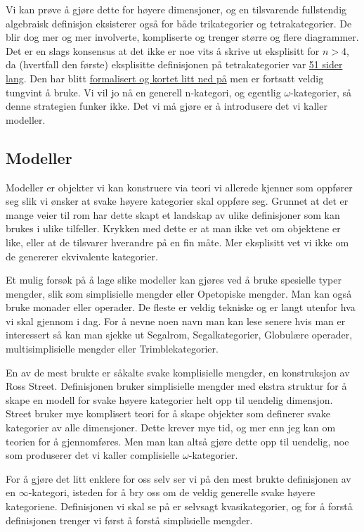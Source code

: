 Vi kan prøve å gjøre dette for høyere dimensjoner, og en tilsvarende fullstendig algebraisk definisjon eksisterer også for både trikategorier og tetrakategorier. 
De blir dog mer og mer involverte, kompliserte og trenger større og flere diagrammer. 
Det er en slags konsensus at det ikke er noe vits å skrive ut eksplisitt for $n>4$, da (hvertfall den første) eksplisitte definisjonen på tetrakategorier var \href{https://math.ucr.edu/home/baez/trimble/tetracategories.html}{51 sider lang}. 
Den har blitt  \href{https://arxiv.org/abs/1112.0560}{formalisert og kortet litt ned på} men er fortsatt veldig tungvint å bruke. 
Vi vil jo nå en generell n-kategori, og egentlig $\omega$-kategorier, så denne strategien funker ikke. 
Det vi må gjøre er å introdusere det vi kaller modeller. 

\subsection{Modeller}
Modeller er objekter vi kan konstruere via teori vi allerede kjenner som oppfører seg slik vi ønsker at svake høyere kategorier skal oppføre seg. 
Grunnet at det er mange veier til rom har dette skapt et landskap av ulike definisjoner som kan brukes i ulike tilfeller. 
Krykken med dette er at man ikke vet om objektene er like, eller at de tilsvarer hverandre på en fin måte. 
Mer eksplisitt vet vi ikke om de genererer ekvivalente kategorier. 

Et mulig forsøk på å lage slike modeller kan gjøres ved å bruke spesielle typer mengder, slik som simplisielle mengder eller Opetopiske mengder. 
Man kan også bruke monader eller operader. 
De fleste er veldig tekniske og er langt utenfor hva vi skal gjennom i dag. 
For å nevne noen navn man kan lese senere hvis man er interessert så kan man sjekke ut Segalrom, Segalkategorier, Globulære operader, multisimplisielle mengder eller Trimblekategorier.

En av de mest brukte er såkalte svake komplisielle mengder, en konstruksjon av Ross Street. 
Definisjonen bruker simplisielle mengder med ekstra struktur for å skape en modell for svake høyere kategorier helt opp til uendelig dimensjon. 
Street bruker mye komplisert teori for å skape objekter som definerer svake kategorier av alle dimensjoner. 
Dette krever mye tid, og mer enn jeg kan om teorien for å gjennomføres. 
Men man kan altså gjøre dette opp til uendelig, noe som produserer det vi kaller complisielle $\omega$-kategorier. 

For å gjøre det litt enklere for oss selv ser vi på den mest brukte definisjonen av en $\infty$-kategori, isteden for å bry oss om de veldig generelle svake høyere kategoriene. 
Definisjonen vi skal se på er selvsagt kvasikategorier, og for å forstå definisjonen trenger vi først å forstå simplisielle mengder. 

